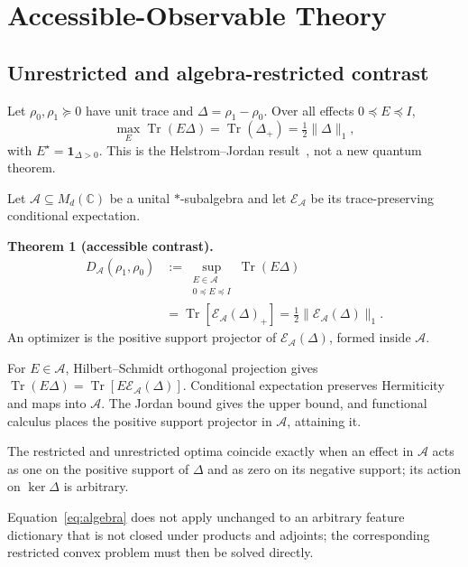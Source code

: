 \documentclass[letterpaper,journal]{IEEEtran}
\newcommand{\Tr}{\operatorname{Tr}}
\newcommand{\A}{\mathcal A}
\newcommand{\C}{\mathbb C}
\begin{document}
\section{Accessible-Observable Theory}

\subsection{Unrestricted and algebra-restricted contrast}

Let $\rho_0,\rho_1\succeq0$ have unit trace and
$\Delta=\rho_1-\rho_0$. Over all effects $0\preceq E\preceq I$,
\begin{equation}
\max_E\Tr(E\Delta)=\Tr(\Delta_+)=\tfrac12\|\Delta\|_1,
\label{eq:helstrom}
\end{equation}
with $E^\star=\mathbf1_{\Delta>0}$. This is the Helstrom--Jordan
result~\cite{helstrom1976}, not a new quantum theorem.

Let $\A\subseteq M_d(\C)$ be a unital $*$-subalgebra and let
$\mathcal E_\A$ be its trace-preserving conditional expectation.

\textbf{Theorem 1 (accessible contrast).}
\begin{equation}
\begin{aligned}
D_\A(\rho_1,\rho_0)
&:=\sup_{\substack{E\in\A\\0\preceq E\preceq I}}\Tr(E\Delta)\\
&=\Tr[\mathcal E_\A(\Delta)_+]
=\tfrac12\|\mathcal E_\A(\Delta)\|_1 .
\end{aligned}
\label{eq:algebra}
\end{equation}
An optimizer is the positive support projector of
$\mathcal E_\A(\Delta)$, formed inside $\A$.

\begin{IEEEproof}
For $E\in\A$, Hilbert--Schmidt orthogonal projection gives
$\Tr(E\Delta)=\Tr[E\mathcal E_\A(\Delta)]$. Conditional expectation preserves
Hermiticity and maps into $\A$. The Jordan bound gives the upper bound, and
functional calculus places the positive support projector in $\A$, attaining
it.
\end{IEEEproof}

The restricted and unrestricted optima coincide exactly when an effect in
$\A$ acts as one on the positive support of $\Delta$ and as zero on its
negative support; its action on $\ker\Delta$ is arbitrary.

Equation~\eqref{eq:algebra} does not apply unchanged to an arbitrary feature
dictionary that is not closed under products and adjoints; the corresponding
restricted convex problem must then be solved directly.
\end{document}
